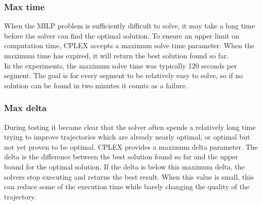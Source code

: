 \subsubsection{Max time}
When the MILP problem is sufficiently difficult to solve, it may take a long time before the solver can find the optimal solution. To ensure an upper limit on computation time, CPLEX accepts a maximum solve time parameter. When the maximum time has expired, it will return the best solution found so far.\\
In the experiments, the maximum solve time was typically 120 seconds per segment. The goal is for every segment to be relatively easy to solve, so if no solution can be found in two minutes it counts as a failure.
\subsubsection{Max delta}
During testing it became clear that the solver often spends a relatively long time trying to improve trajectories which are already nearly optimal, or optimal but not yet proven to be optimal. CPLEX provides a maximum delta parameter. The delta is the difference between the best solution found so far and the upper bound for the optimal solution. If the delta is below this maximum delta, the solvers stop executing and returns the best result. When this value is small, this can reduce some of the execution time while barely changing the quality of the trajectory.

